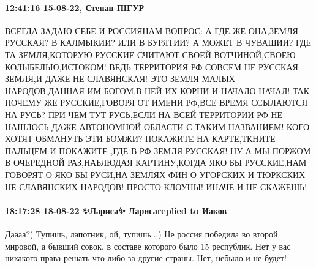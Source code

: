  
 
 
 
 

\paragraph{12:41:16 15-08-22, Степан ПІГУР}

ВСЕГДА ЗАДАЮ СЕБЕ И РОССИЯНАМ ВОПРОС: А ГДЕ ЖЕ ОНА,ЗЕМЛЯ
РУССКАЯ? В КАЛМЫКИИ? ИЛИ В БУРЯТИИ? А МОЖЕТ В ЧУВАШИИ? ГДЕ ТА ЗЕМЛЯ,КОТОРУЮ
РУССКИЕ СЧИТАЮТ СВОЕЙ ВОТЧИНОЙ,СВОЕЮ КОЛЫБЕЛЬЮ,ИСТОКОМ! ВЕДЬ ТЕРРИТОРИЯ РФ
СОВСЕМ НЕ РУССКАЯ ЗЕМЛЯ,И ДАЖЕ НЕ СЛАВЯНСКАЯ! ЭТО ЗЕМЛЯ МАЛЫХ НАРОДОВ,ДАННАЯ ИМ
БОГОМ.В НЕЙ ИХ КОРНИ И НАЧАЛО НАЧАЛ! ТАК ПОЧЕМУ ЖЕ РУССКИЕ,ГОВОРЯ ОТ ИМЕНИ
РФ,ВСЕ ВРЕМЯ ССЫЛАЮТСЯ НА РУСЬ? ПРИ ЧЕМ ТУТ РУСЬ,ЕСЛИ НА ВСЕЙ ТЕРРИТОРИИ РФ НЕ
НАШЛОСЬ ДАЖЕ АВТОНОМНОЙ ОБЛАСТИ С ТАКИМ НАЗВАНИЕМ! КОГО ХОТЯТ ОБМАНУТЬ ЭТИ
БОМЖИ? ПОКАЖИТЕ НА КАРТЕ,ТКНИТЕ ПАЛЬЦЕМ И ПОКАЖИТЕ ,ГДЕ В РФ ЗЕМЛЯ РУССКАЯ! НУ
А МЫ ПОРЖОМ В ОЧЕРЕДНОЙ РАЗ,НАБЛЮДАЯ КАРТИНУ,КОГДА ЯКО БЫ РУССКИЕ,НАМ ГОВОРЯТ О
ЯКО БЫ РУСИ,НА ЗЕМЛЯХ ФИН О-УГОРСКИХ И ТЮРКСКИХ НЕ СЛАВЯНСКИХ НАРОДОВ! ПРОСТО
КЛОУНЫ! ИНАЧЕ И НЕ СКАЖЕШЬ!

\paragraph{18:17:28 18-08-22 ✨Лариса✨ Ларисаreplied to Иаков}

Даааа?) Тупишь, лапотник, ой, тупишь...) Не россия победила во второй мировой,
а бывший совок, в составе которого было 15 республик. Нет у вас никакого права
решать что-либо за другие страны. Нет, небыло и не будет!
